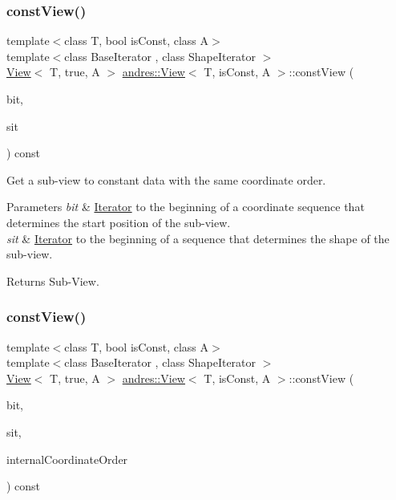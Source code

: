 \subsubsection{\texorpdfstring{const\+View()}{constView()}\hspace{0.1cm}{\footnotesize\ttfamily [3/4]}}
{\footnotesize\ttfamily template$<$class T, bool is\+Const, class A$>$ \\
template$<$class Base\+Iterator , class Shape\+Iterator $>$ \\
\hyperlink{classandres_1_1View}{View}$<$ T, true, A $>$ \hyperlink{classandres_1_1View}{andres\+::\+View}$<$ T, is\+Const, A $>$\+::const\+View (\begin{DoxyParamCaption}\item[{Base\+Iterator}]{bit,  }\item[{Shape\+Iterator}]{sit }\end{DoxyParamCaption}) const\hspace{0.3cm}{\ttfamily [inline]}}

Get a sub-\/view to constant data with the same coordinate order.


\begin{DoxyParams}{Parameters}
{\em bit} & \hyperlink{classandres_1_1Iterator}{Iterator} to the beginning of a coordinate sequence that determines the start position of the sub-\/view. \\
\hline
{\em sit} & \hyperlink{classandres_1_1Iterator}{Iterator} to the beginning of a sequence that determines the shape of the sub-\/view. \\
\hline
\end{DoxyParams}
\begin{DoxyReturn}{Returns}
Sub-\/\+View. 
\end{DoxyReturn}
\mbox{\label{classandres_1_1View_a2b62323500d25777e435c377a586a68a}} 
\subsubsection{\texorpdfstring{const\+View()}{constView()}\hspace{0.1cm}{\footnotesize\ttfamily [4/4]}}
{\footnotesize\ttfamily template$<$class T, bool is\+Const, class A$>$ \\
template$<$class Base\+Iterator , class Shape\+Iterator $>$ \\
\hyperlink{classandres_1_1View}{View}$<$ T, true, A $>$ \hyperlink{classandres_1_1View}{andres\+::\+View}$<$ T, is\+Const, A $>$\+::const\+View (\begin{DoxyParamCaption}\item[{Base\+Iterator}]{bit,  }\item[{Shape\+Iterator}]{sit,  }\item[{const \hyperlink{namespaceandres_a2ac8b7aa89d44e8188a7c0ba50f4306b}{Coordinate\+Order} \&}]{internal\+Coordinate\+Order }\end{DoxyParamCaption}) const\hspace{0.3cm}{\ttfamily [inline]}}

